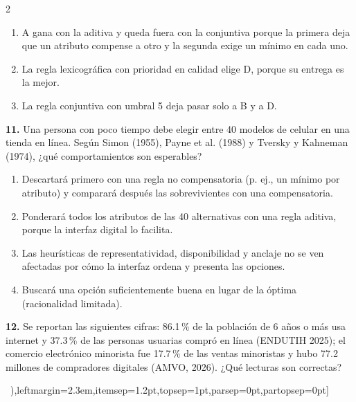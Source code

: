 \documentclass[10pt,letterpaper]{article}
\newcommand{\cas}{\framebox[1.0em]{\rule{0pt}{1.05ex}}}
\begin{document}
\begin{multicols}{2}
\begin{minipage}[t]{\columnwidth}
\begin{enumerate}[label=\cas\ \alph*),leftmargin=2.3em,itemsep=1.2pt,topsep=1pt,parsep=0pt,partopsep=0pt]
\item A gana con la aditiva y queda fuera con la conjuntiva porque la primera deja que un atributo compense a otro y la segunda exige un mínimo en cada uno.
\item La regla lexicográfica con prioridad en calidad elige D, porque su entrega es la mejor.
\item La regla conjuntiva con umbral 5 deja pasar solo a B y a D.
\end{enumerate}\end{minipage}\par\vspace{3pt}
\begin{minipage}[t]{\columnwidth}\noindent\textbf{11.} Una persona con poco tiempo debe elegir entre 40 modelos de celular en una tienda en línea. Según Simon (1955), Payne et al. (1988) y Tversky y Kahneman (1974), ¿qué comportamientos son esperables?
\vspace{1pt}\begin{enumerate}[label=\cas\ \alph*),leftmargin=2.3em,itemsep=1.2pt,topsep=1pt,parsep=0pt,partopsep=0pt]
\item Descartará primero con una regla no compensatoria (p. ej., un mínimo por atributo) y comparará después las sobrevivientes con una compensatoria.
\item Ponderará todos los atributos de las 40 alternativas con una regla aditiva, porque la interfaz digital lo facilita.
\item Las heurísticas de representatividad, disponibilidad y anclaje no se ven afectadas por cómo la interfaz ordena y presenta las opciones.
\item Buscará una opción suficientemente buena en lugar de la óptima (racionalidad limitada).
\end{enumerate}\end{minipage}\par\vspace{3pt}
\begin{minipage}[t]{\columnwidth}\noindent\textbf{12.} Se reportan las siguientes cifras: 86.1\,\% de la población de 6 años o más usa internet y 37.3\,\% de las personas usuarias compró en línea (ENDUTIH 2025); el comercio electrónico minorista fue 17.7\,\% de las ventas minoristas y hubo 77.2 millones de compradores digitales (AMVO, 2026). ¿Qué lecturas son correctas?
\vspace{1pt}\begin{enumerate}[label=\cas\ \alph*),leftmargin=2.3em,itemsep=1.2pt,topsep=1pt,parsep=0pt,partopsep=0pt]

\end{enumerate}
\end{minipage}
\end{multicols}
\end{document}
